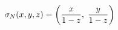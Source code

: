 \documentclass[preview]{standalone}
\begin{document}
\begin{align*}
\special{dvisvgm:raw <g id='unique000'>}\sigma_N(x,y,z) = \left(\frac{x}{1-z},\; \frac{y}{1-z}\right)\special{dvisvgm:raw </g>}
\end{align*}
\end{document}
